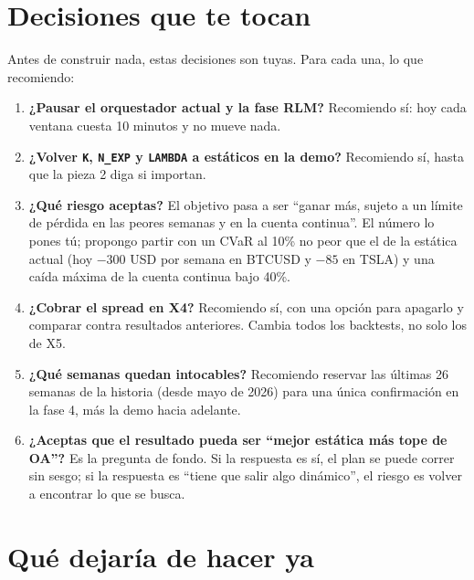 \documentclass[11pt,a4paper]{article}
\newcommand{\code}[1]{\texttt{\small #1}}
\begin{document}
\section{Decisiones que te tocan}

Antes de construir nada, estas decisiones son tuyas. Para cada una, lo que recomiendo:

\begin{enumerate}[leftmargin=1.4em]
  \item \textbf{¿Pausar el orquestador actual y la fase RLM?} Recomiendo sí: hoy cada ventana cuesta 10
        minutos y no mueve nada.
  \item \textbf{¿Volver \code{K}, \code{N\_EXP} y \code{LAMBDA} a estáticos en la demo?} Recomiendo sí,
        hasta que la pieza 2 diga si importan.
  \item \textbf{¿Qué riesgo aceptas?} El objetivo pasa a ser ``ganar más, sujeto a un límite de pérdida en
        las peores semanas y en la cuenta continua''. El número lo pones tú; propongo partir con un CVaR al
        10\% no peor que el de la estática actual (hoy $-300$ USD por semana en BTCUSD y $-85$ en TSLA) y una
        caída máxima de la cuenta continua bajo 40\%.
  \item \textbf{¿Cobrar el spread en X4?} Recomiendo sí, con una opción para apagarlo y comparar contra
        resultados anteriores. Cambia todos los backtests, no solo los de X5.
  \item \textbf{¿Qué semanas quedan intocables?} Recomiendo reservar las últimas 26 semanas de la historia
        (desde mayo de 2026) para una única confirmación en la fase 4, más la demo hacia adelante.
  \item \textbf{¿Aceptas que el resultado pueda ser ``mejor estática más tope de OA''?} Es la pregunta de
        fondo. Si la respuesta es sí, el plan se puede correr sin sesgo; si la respuesta es ``tiene que salir
        algo dinámico'', el riesgo es volver a encontrar lo que se busca.
\end{enumerate}

\section{Qué dejaría de hacer ya}
\end{document}
